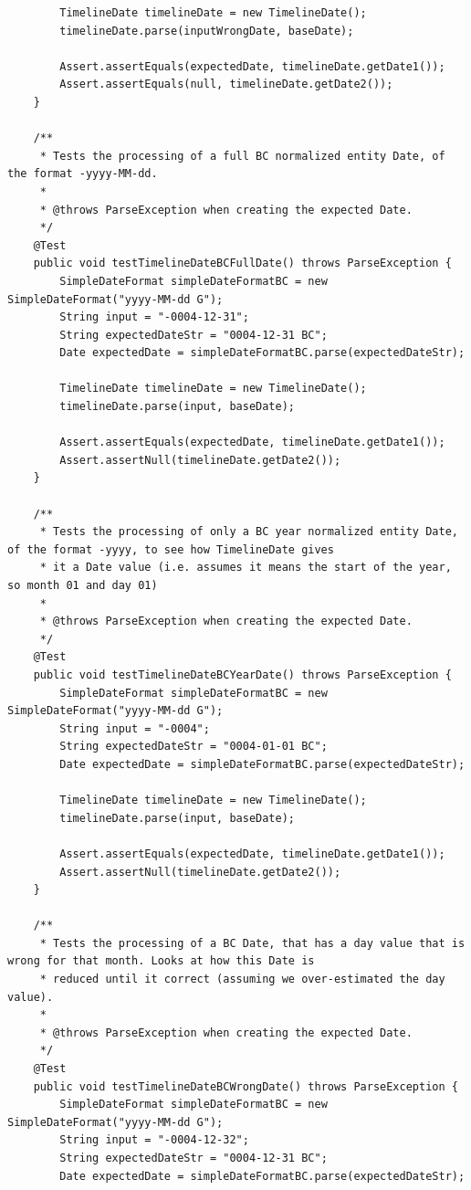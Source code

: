 \begin{lstlisting}
        TimelineDate timelineDate = new TimelineDate();
        timelineDate.parse(inputWrongDate, baseDate);

        Assert.assertEquals(expectedDate, timelineDate.getDate1());
        Assert.assertEquals(null, timelineDate.getDate2());
    }

    /**
     * Tests the processing of a full BC normalized entity Date, of the format -yyyy-MM-dd.
     *
     * @throws ParseException when creating the expected Date.
     */
    @Test
    public void testTimelineDateBCFullDate() throws ParseException {
        SimpleDateFormat simpleDateFormatBC = new SimpleDateFormat("yyyy-MM-dd G");
        String input = "-0004-12-31";
        String expectedDateStr = "0004-12-31 BC";
        Date expectedDate = simpleDateFormatBC.parse(expectedDateStr);

        TimelineDate timelineDate = new TimelineDate();
        timelineDate.parse(input, baseDate);

        Assert.assertEquals(expectedDate, timelineDate.getDate1());
        Assert.assertNull(timelineDate.getDate2());
    }

    /**
     * Tests the processing of only a BC year normalized entity Date, of the format -yyyy, to see how TimelineDate gives
     * it a Date value (i.e. assumes it means the start of the year, so month 01 and day 01)
     *
     * @throws ParseException when creating the expected Date.
     */
    @Test
    public void testTimelineDateBCYearDate() throws ParseException {
        SimpleDateFormat simpleDateFormatBC = new SimpleDateFormat("yyyy-MM-dd G");
        String input = "-0004";
        String expectedDateStr = "0004-01-01 BC";
        Date expectedDate = simpleDateFormatBC.parse(expectedDateStr);

        TimelineDate timelineDate = new TimelineDate();
        timelineDate.parse(input, baseDate);

        Assert.assertEquals(expectedDate, timelineDate.getDate1());
        Assert.assertNull(timelineDate.getDate2());
    }

    /**
     * Tests the processing of a BC Date, that has a day value that is wrong for that month. Looks at how this Date is
     * reduced until it correct (assuming we over-estimated the day value).
     *
     * @throws ParseException when creating the expected Date.
     */
    @Test
    public void testTimelineDateBCWrongDate() throws ParseException {
        SimpleDateFormat simpleDateFormatBC = new SimpleDateFormat("yyyy-MM-dd G");
        String input = "-0004-12-32";
        String expectedDateStr = "0004-12-31 BC";
        Date expectedDate = simpleDateFormatBC.parse(expectedDateStr);


\end{lstlisting}

